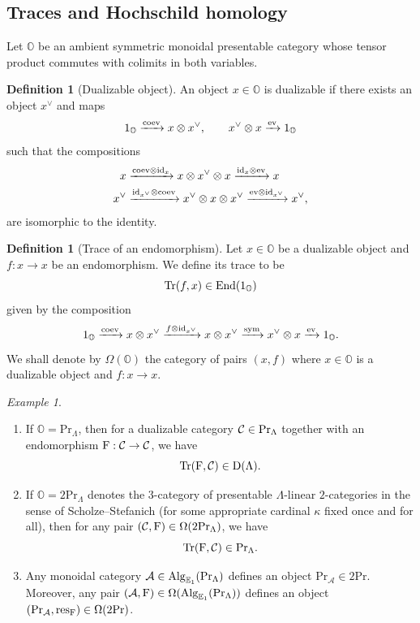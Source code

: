 \documentclass[a4paper, 10pt, oneside, reqno]{amsart}
\theoremstyle{plain}
\theoremstyle{definition}
\newtheorem{defi}[thm]{Definition}
\theoremstyle{remark}
\newtheorem{example}[thm]{Example}
\newcommand{\Prr}{\mathrm{Pr}}
\newcommand{\E}{\mathbb{E}}
\newcommand{\Obb}{\mathbb{O}}
\newcommand{\Acal}{\mathcal{A}}
\newcommand{\restr}{\mathrm{res}}
\begin{document}
\subsection{Traces and Hochschild homology}\label{sec:recollection-hh}

Let $\Obb$ be an ambient symmetric monoidal presentable category whose tensor product commutes with colimits in both variables. 

\begin{defi}[Dualizable object]
An object $x \in \Obb$ is dualizable if there exists an object $x^{\vee}$ and maps 
$$1_{\Obb} \xrightarrow{\coev} x \otimes x^{\vee}, \qquad x^{\vee} \otimes x \xrightarrow{\ev} 1_{\Obb}$$
such that the compositions 
\begin{align*}
x &\xrightarrow{\mathrm{coev} \otimes \mathrm{id}_x} x \otimes x^{\vee} \otimes x \xrightarrow{\mathrm{id}_x \otimes \mathrm{ev}} x \\
x^{\vee} &\xrightarrow{\mathrm{id}_{x^{\vee}} \otimes \mathrm{coev}} x^{\vee} \otimes x \otimes x^{\vee} \xrightarrow{\mathrm{ev} \otimes \mathrm{id}_{x^{\vee}}} x^{\vee},
\end{align*}
are isomorphic to the identity. 
\end{defi}

\begin{defi}[Trace of an endomorphism]
Let $x \in \Obb$ be a dualizable object and $f : x \to x$ be an endomorphism. We define its trace to be 
$$\Tr(f, x) \in \End(1_{\Obb})$$
given by the composition
$$1_{\Obb} \xrightarrow{\coev} x \otimes x^{\vee} \xrightarrow{f \otimes \id_{x^{\vee}}} x \otimes x^{\vee} \xrightarrow{\mathrm{sym}} x^{\vee} \otimes x \xrightarrow{\ev} 1_{\Obb}.$$
We shall denote by $\Omega(\Obb)$ the category of pairs $(x,f)$ where $x \in \Obb$ is a dualizable object and $f : x \to x$. 
\end{defi}

\begin{example}
\begin{enumerate}
\item If $\Obb = \Prr_{\Lambda}$, then for a dualizable category $\Ccal \in \Prr_{\Lambda}$ together with an endomorphism $\mathrm{F} : \mathcal{C} \to \mathcal{C}$, we have 
$$\mathrm{Tr}(\mathrm{F}, \mathcal{C}) \in \mathrm{D}(\Lambda).$$
\item If $\Obb = 2\Prr_{\Lambda}$ denotes the $3$-category of presentable $\Lambda$-linear $2$-categories in the sense of Scholze--Stefanich \cite{ScholzeStefanich} (for some appropriate cardinal $\kappa$ fixed once and for all), then for any pair $(\Ccal,\Frob) \in \Omega(2\Prr_{\Lambda})$, we have 
$$\Tr(\Frob, \Ccal) \in \Prr_{\Lambda}.$$
\item Any monoidal category $\Acal \in \Alg_{\E_1}(\Prr_{\Lambda})$ defines an object $\Prr_{\Acal} \in 2\Prr$. Moreover, any pair $(\Acal, \Frob) \in \Omega(\Alg_{\E_1}(\Prr_{\Lambda}))$ defines an object $(\Prr_{\Acal}, \restr_{\Frob}) \in \Omega(2\Prr)$.
\end{enumerate}
\end{example}
\end{document}
